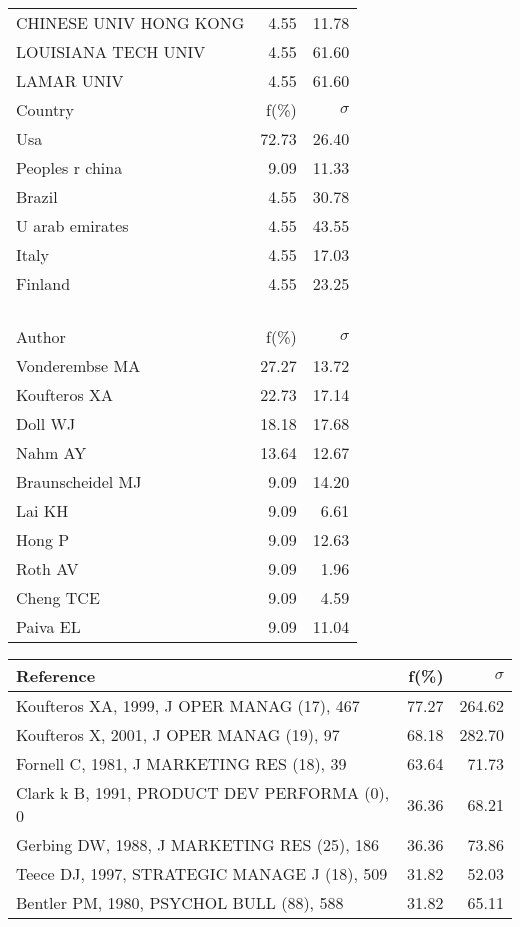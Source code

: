 \documentclass[a4paper,11pt]{report}
\begin{document}
\begin{landscape}
\begin{table}[!ht]
{\begin{tabular}{|l r r|}
CHINESE UNIV HONG KONG & 4.55 & 11.78\\
LOUISIANA TECH UNIV & 4.55 & 61.60\\
LAMAR UNIV & 4.55 & 61.60\\
\hline
\hline
Country & f(\%) & $\sigma$\\
\hline
Usa & 72.73 & 26.40\\
Peoples r china & 9.09 & 11.33\\
Brazil & 4.55 & 30.78\\
U arab emirates & 4.55 & 43.55\\
Italy & 4.55 & 17.03\\
Finland & 4.55 & 23.25\\
 &  & \\
 &  & \\
 &  & \\
 &  & \\
\hline
\hline
Author & f(\%) & $\sigma$\\
\hline
Vonderembse MA & 27.27 & 13.72\\
Koufteros XA & 22.73 & 17.14\\
Doll WJ & 18.18 & 17.68\\
Nahm AY & 13.64 & 12.67\\
Braunscheidel MJ & 9.09 & 14.20\\
Lai KH & 9.09 & 6.61\\
Hong P & 9.09 & 12.63\\
Roth AV & 9.09 & 1.96\\
Cheng TCE & 9.09 & 4.59\\
Paiva EL & 9.09 & 11.04\\
\hline
\end{tabular}
}
{\scriptsize\begin{tabular}{|l r r|}
\hline
Reference & f(\%) & $\sigma$\\
\hline
Koufteros XA, 1999, J OPER MANAG (17), 467 & 77.27 & 264.62\\
Koufteros X, 2001, J OPER MANAG (19), 97 & 68.18 & 282.70\\
Fornell C, 1981, J MARKETING RES (18), 39 & 63.64 & 71.73\\
Clark k B, 1991, PRODUCT DEV PERFORMA (0), 0 & 36.36 & 68.21\\
Gerbing DW, 1988, J MARKETING RES (25), 186 & 36.36 & 73.86\\
Teece DJ, 1997, STRATEGIC MANAGE J (18), 509 & 31.82 & 52.03\\
Bentler PM, 1980, PSYCHOL BULL (88), 588 & 31.82 & 65.11\\

\end{tabular}}
\end{table}
\end{landscape}
\end{document}
